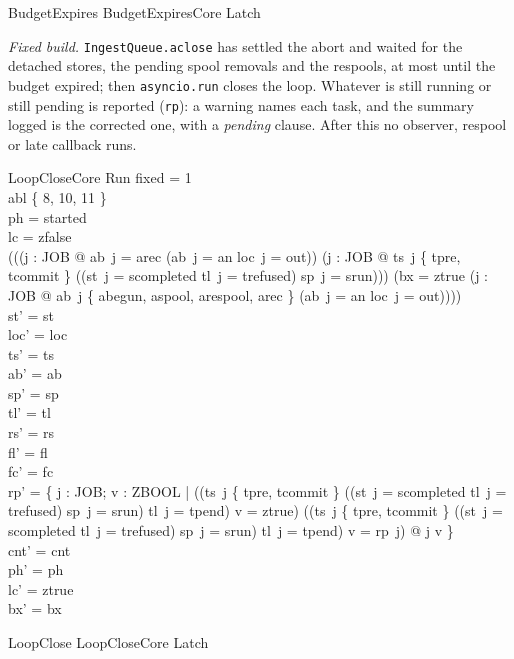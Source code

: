 \documentclass[a4paper,10pt,fleqn]{article}
\newcommand{\field}[1]{\texttt{#1}}
\begin{document}
\begin{zed}
BudgetExpires  BudgetExpiresCore \land Latch
\end{zed}

\emph{Fixed build.} \field{IngestQueue.aclose} has settled the abort and waited for
the detached stores, the pending spool removals and the respools, at most until
the budget expired; then \field{asyncio.run} closes the loop. Whatever is still
running or still pending is reported (\field{rp}): a warning names each task, and
the summary logged is the corrected one, with a \emph{pending} clause. After this no
observer, respool or late callback runs.

\begin{schema}{LoopCloseCore}
\Delta Run
\where
fixed = 1 \\
abl \notin \{ 8, 10, 11 \} \\
ph = started \\
lc = zfalse \\
(((\forall j : JOB @ ab~j = arec \lor (ab~j = an \land loc~j = out)) \land (\forall j : JOB @ ts~j \notin \{ tpre, tcommit \} \land \lnot ((st~j = scompleted \lor tl~j = trefused) \land sp~j = srun))) \lor (bx = ztrue \land (\forall j : JOB @ ab~j \in \{ abegun, aspool, arespool, arec \} \lor (ab~j = an \land loc~j = out)))) \\
st' = st \\
loc' = loc \\
ts' = ts \\
ab' = ab \\
sp' = sp \\
tl' = tl \\
rs' = rs \\
fl' = fl \\
fc' = fc \\
rp' = \{ j : JOB; v : ZBOOL | ((ts~j \in \{ tpre, tcommit \} \lor ((st~j = scompleted \lor tl~j = trefused) \land sp~j = srun) \lor tl~j = tpend) \land v = ztrue) \lor (\lnot (ts~j \in \{ tpre, tcommit \} \lor ((st~j = scompleted \lor tl~j = trefused) \land sp~j = srun) \lor tl~j = tpend) \land v = rp~j) @ j \mapsto v \} \\
cnt' = cnt \\
ph' = ph \\
lc' = ztrue \\
bx' = bx
\end{schema}

\begin{zed}
LoopClose  LoopCloseCore \land Latch
\end{zed}
\end{document}
